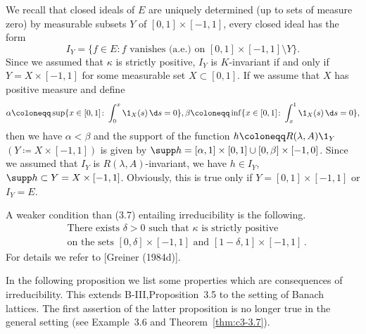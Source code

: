 \begin{examples}
\begin{enumerate}[(a), wide]
	We recall that closed ideals of $E$ are uniquely determined (up to sets of measure zero) by measurable subsets $Y$ of $[0,1]\times[-1,1]$, \ie  every closed ideal has the form
	\[
		I_{Y} = \{f \in E \colon f \text{ vanishes (a.e.) on } [0,1]\times[-1,1] \setminus Y\}.
	\]
	Since we assumed that $\kappa$ is strictly positive, $I_{Y}$ is $K$-invariant if and only if $Y = X\times[-1,1]$ for some measurable set $X \subset [0,1]$.
	If we assume that $X$ has positive measure and define
	\[
	\alpha \coloneqq \sup\{x \in [0,1] \colon \int_{0}^{x} \1_{X}(s)\,\d s = 0\}, \beta \coloneqq \inf\{x \in [0,1] \colon \int_{x}^{1} \1_{X}(s)\,\d s = 0\},
	\] 
	then we have $\alpha < \beta$ and the support of the function $h \coloneqq R(\lambda,A)\1_{Y}$
	$(Y \coloneqq X\times[-1,1])$ is given by $\supp h = [\alpha,1]\times[0,1] \cup [0,\beta]\times[-1,0]$.
	Since we assumed that $I_{Y}$ is $R(\lambda,A)$-invariant, we have $h \in I_{Y}$, \ie  $\supp h \subset Y = X\times[-1,1]$.
	Obviously, this is true only if $Y = [0,1]\times[-1,1]$ or $I_{Y} = E$.
	
	A weaker condition than (3.7) entailing irreducibility is the following.
	\begin{equation}\label{eq:c3-3.8}
		\begin{aligned}
		&\text{There exists } \delta > 0 \text{ such that } \kappa \text{ is strictly positive}\\
		&\text{on the sets } [0,\delta]\times[-1,1] \text{ and } [1-\delta,1]\times[-1,1]\,.
		\end{aligned}
	\end{equation}
	For details we refer to [Greiner (1984d)].
	\end{enumerate}	
\end{examples}
	
In the following proposition we list some properties which are conse­quences of irreducibility. This extends B-III,Proposition~3.5 to the setting of Banach lattices. The first assertion of the latter proposition is no longer true in the general setting (see Example~3.6 and Theorem~\ref{thm:c3-3.7}). 

